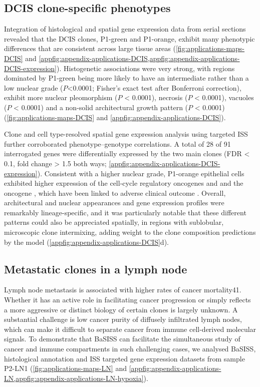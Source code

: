 \subsection{DCIS clone-specific phenotypes}

Integration of histological and spatial gene expression data from serial sections revealed that the DCIS clones, P1-green and P1-orange, exhibit many phenotypic differences that are consistent across large tissue areas (\cref{fig:applications-maps-DCIS} and \cref{appfig:appendix-applications-DCIS,appfig:appendix-applications-DCIS-expression}). Histogenetic associations were very strong, with regions dominated by P1-green being more likely to have an intermediate rather than a low nuclear grade ($P$<0.0001; Fisher’s exact test after Bonferroni correction), exhibit more nuclear pleomorphism ($P$ < 0.0001), necrosis ($P$ < 0.0001), vacuoles ($P$ < 0.0001) and a non-solid architectural growth pattern ($P$ < 0.0001) (\cref{fig:applications-maps-DCIS} and \cref{appfig:appendix-applications-DCIS}).

Clone and cell type-resolved spatial gene expression analysis using targeted \ac{ISS} further corroborated phenotype–genotype correlations. A total of 28 of 91 interrogated genes were differentially expressed by the two main clones (\ac{FDR} < 0.1, fold change > 1.5 both ways; \cref{appfig:appendix-applications-DCIS-expression}). Consistent with a higher nuclear grade, P1-orange epithelial cells exhibited higher expression of the cell-cycle regulatory oncogenes  and  and the oncogene , which have been linked to adverse clinical outcome \parencite{Solin2013-zy}. Overall, architectural and nuclear appearances and gene expression profiles were remarkably lineage-specific, and it was particularly notable that these different patterns could also be appreciated spatially, in regions with sublobular, microscopic clone intermixing, adding weight to the clone composition predictions by the model (\cref{appfig:appendix-applications-DCIS}d).

\subsection{Metastatic clones in a lymph node}

Lymph node metastasis is associated with higher rates of cancer mortality41. Whether it has an active role in facilitating cancer progression or simply reflects a more aggressive or distinct biology of certain clones is largely unknown. A substantial challenge is low cancer purity of diffusely infiltrated lymph nodes, which can make it difficult to separate cancer from immune cell-derived molecular signals. To demonstrate that \ac{BaSISS} can facilitate the simultaneous study of cancer and immune compartments in such challenging cases, we analysed \ac{BaSISS}, histological annotation and \ac{ISS} targeted gene expression datasets from sample P2-LN1 (\cref{fig:applications-maps-LN} and \cref{appfig:appendix-applications-LN,appfig:appendix-applications-LN-hypoxia}).


